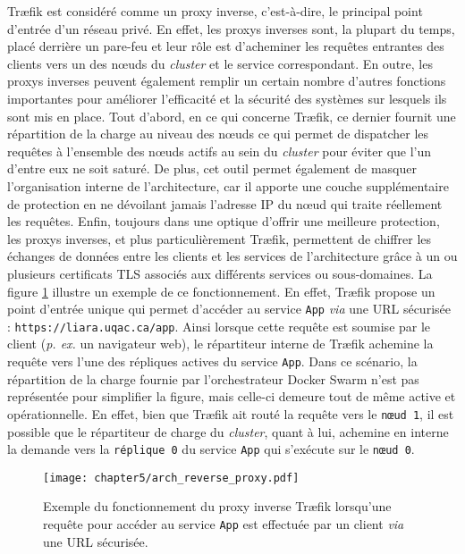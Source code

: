 Tr\ae{}fik est considéré comme un proxy inverse, c'est-à-dire, le principal point d'entrée d'un réseau privé. En effet, les proxys inverses sont, la plupart du temps, placé derrière un pare-feu et leur rôle est d'acheminer les requêtes entrantes des clients vers un des n\oe{}uds du \textit{cluster} et le service correspondant. En outre, les proxys inverses peuvent également remplir un certain nombre d'autres fonctions importantes pour améliorer l'efficacité et la sécurité des systèmes sur lesquels ils sont mis en place. Tout d'abord, en ce qui concerne Tr\ae{}fik, ce dernier fournit une répartition de la charge au niveau des n\oe{}uds ce qui permet de dispatcher les requêtes à l'ensemble des n\oe{}uds actifs au sein du \textit{cluster} pour éviter que l'un d'entre eux ne soit saturé. De plus, cet outil permet également de masquer l'organisation interne de l'architecture, car il apporte une couche supplémentaire de protection en ne dévoilant jamais l'adresse IP du n\oe{}ud qui traite réellement les requêtes. Enfin, toujours dans une optique d'offrir une meilleure protection, les proxys inverses, et plus particulièrement Tr\ae{}fik, permettent de chiffrer les échanges de données entre les clients et les services de l'architecture grâce à un ou plusieurs certificats \acs{TLS} associés aux différents services ou sous-domaines. La figure \ref{fig:arch_reverse_proxy} illustre un exemple de ce fonctionnement. En effet, Tr\ae{}fik propose un point d'entrée unique qui permet d'accéder au service \texttt{App} \textit{via} une \acs{URL} sécurisée : \texttt{https://liara.uqac.ca/app}. Ainsi lorsque cette requête est soumise par le client (\textit{p. ex. } un navigateur web), le répartiteur interne de Tr\ae{}fik achemine la requête vers l'une des répliques actives du service \texttt{App}. Dans ce scénario, la répartition de la charge fournie par l'orchestrateur Docker Swarm n'est pas représentée pour simplifier la figure, mais celle-ci demeure tout de même active et opérationnelle. En effet, bien que Tr\ae{}fik ait routé la requête vers le \texttt{n\oe{}ud 1}, il est possible que le répartiteur de charge du \textit{cluster}, quant à lui, achemine en interne la demande vers la \texttt{réplique 0} du service \texttt{App} qui s'exécute sur le \texttt{n\oe{}ud 0}.

\begin{figure}[H]
	\centering
	\texttt{[image: chapter5/arch\_reverse\_proxy.pdf]}
        \caption{Exemple du fonctionnement du proxy inverse Tr\ae{}fik lorsqu'une requête pour accéder au service \texttt{App} est effectuée par un client \textit{via} une \acs{URL} sécurisée.}
	\label{fig:arch_reverse_proxy}
\end{figure}

